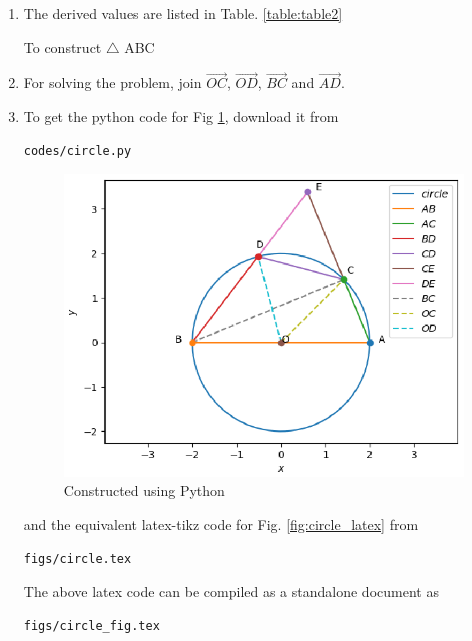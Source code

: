 \begin{enumerate}[label=\thesection.\arabic*.,ref=\thesection.\theenumi]
\item The derived values are listed in 
Table. \ref{table:table2} 
\begin{table}[ht!]
\centering

\caption{To construct $\triangle $ ABC}
\label{table:table2}
\end{table}
%
\item For solving the problem, join $\vec{OC}$, $\vec{OD}$, $\vec{BC}$ and $\vec{AD}$.
\item To get the python code for Fig \ref{fig:circle_python}, download it from
\begin{lstlisting}
codes/circle.py
\end{lstlisting}
\begin{figure}[!ht]
\centering
\includegraphics[width= \columnwidth]{Figure_1.eps}
\caption{Constructed using Python}
\label{fig:circle_python}
\end{figure}
%
and the equivalent latex-tikz code for Fig. \ref{fig:circle_latex} from
\begin{lstlisting}
figs/circle.tex
\end{lstlisting}
%
The above latex code can be compiled as a standalone document as
\begin{lstlisting}
figs/circle_fig.tex
\end{lstlisting}



\end{enumerate}